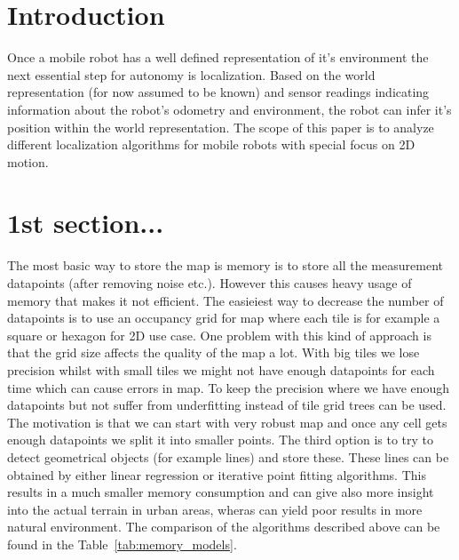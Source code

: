 \documentclass[12pt, a4paper, onecolumn]{article}
\begin{document}
\maketitle

\section{Introduction}

Once a mobile robot has a well defined representation of it's environment the next essential step for autonomy is localization. Based on the world representation (for now assumed to be known) and sensor readings indicating information about the robot's odometry and environment, the robot can infer it's position within the world representation. The scope of this paper is to analyze different localization algorithms for mobile robots with special focus on 2D motion.

\section{1st section...}
The most basic way to store the map is memory is to store all the measurement datapoints (after removing noise etc.).
However this causes heavy usage of memory that makes it not efficient.
The easieiest way to decrease the number of datapoints is to use an occupancy grid for map where each tile is for example a square or hexagon for 2D use case.
One problem with this kind of approach is that the grid size affects the quality of the map a lot.
With big tiles we lose precision whilst with small tiles we might not have enough datapoints for each time which can cause errors in map.
To keep the precision where we have enough datapoints but not suffer from underfitting instead of tile grid trees can be used.
The motivation is that we can start with very robust map and once any cell gets enough datapoints we split it into smaller points.
The third option is to try to detect geometrical objects (for example lines) and store these.
These lines can be obtained by either linear regression or iterative point fitting algorithms.
This results in a much smaller memory consumption and can give also more insight into the actual terrain in urban areas, wheras can yield poor results in more natural environment.
\cite{AlgorithmsForIndoorMapping}
The comparison of the algorithms described above can be found in the Table~\ref{tab:memory_models}.
\end{document}

